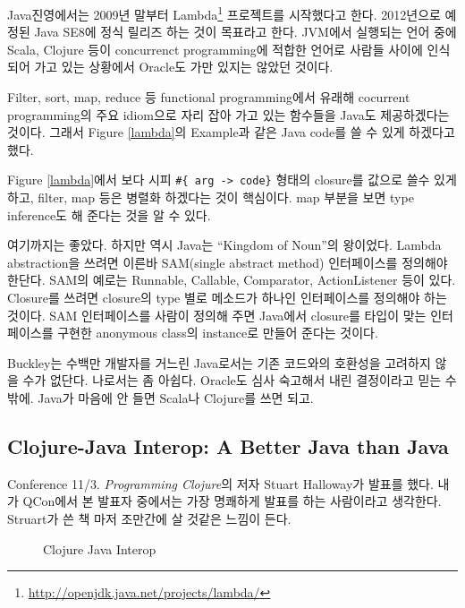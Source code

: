 \documentclass[11pt]{article}
\begin{document}
Java진영에서는 2009년 
말부터 Lambda\footnote{\url{http://openjdk.java.net/projects/lambda/}}
프로젝트를 시작했다고 한다. 
2012년으로 예정된 Java SE8에 정식 릴리즈 하는 것이 목표라고 한다.
JVM에서 실행되는 언어 중에 Scala, Clojure 등이 concurrenct programming에 
적합한 언어로 사람들 사이에 인식되어 가고 있는 상황에서 Oracle도 가만 있지는 
않았던 것이다.

Filter, sort, map, reduce 등 functional programming에서 유래해 cocurrent
programming의 주요 idiom으로 자리 잡아 가고 있는 함수들을 Java도
제공하겠다는 것이다. 그래서 Figure \ref{lambda}의 Example과 같은 Java code를 쓸
수 있게 하겠다고 했다.
 
Figure \ref{lambda}에서 보다 시피 \verb=#{ arg -> code}= 형태의 closure를 
값으로 쓸수 있게 하고, filter, map 등은 병렬화 하겠다는 것이 핵심이다.
map 부분을 보면 type inference도 해 준다는 것을 알 수 있다.
 
여기까지는 좋았다. 하지만 역시 Java는 ``Kingdom of Noun''\cite{yegge}의 
왕이었다. Lambda abstraction을 쓰려면 이른바 SAM(single abstract method)
인터페이스를 정의해야 한단다.  SAM의 예로는 Runnable, Callable,
Comparator, ActionListener 등이 있다. Closure를 쓰려면 closure의 type 별로
메소드가 하나인 인터페이스를 정의해야 하는 것이다. SAM 인터페이스를 사람이
정의해 주면 Java에서 closure를 타입이 맞는 인터페이스를 구현한 anonymous 
class의 instance로 만들어 준다는 것이다.
 
Buckley는 수백만 개발자를 거느린 Java로서는 기존 코드와의 호환성을 고려하지 
않을 수가 없단다. 나로서는 좀 아쉽다. Oracle도 심사 숙고해서 내린 결정이라고 
믿는 수 밖에. Java가 마음에 안 들면 Scala나 Clojure를 쓰면 되고.

\subsection{Clojure-Java Interop: A Better Java than Java}

Conference 11/3.
\textit{Programming Clojure}\cite{halloway}의 저자 Stuart Halloway가 발표를 
했다. 내가 QCon에서 본 발표자 중에서는 가장 명쾌하게 발표를 하는 사람이라고 
생각한다. Struart가 쓴 책 마저 조만간에 살 것같은 느낌이 든다.
 
\begin{figure}[t]
    \begin{Frame}
        \begin{center}
        \end{center}
    \end{Frame}
    \caption{Clojure Java Interop}
    \label{clojure java}
\end{figure}
\end{document}
